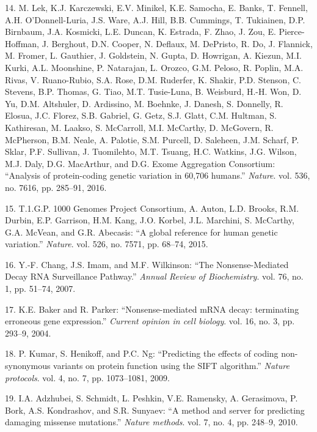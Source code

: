 \documentclass[12pt,twoside]{ugathesis}
\begin{document}
\hypertarget{ref-Lek2016}{}
14. M. Lek, K.J. Karczewski, E.V. Minikel, K.E. Samocha, E. Banks, T.
Fennell, A.H. O'Donnell-Luria, J.S. Ware, A.J. Hill, B.B. Cummings, T.
Tukiainen, D.P. Birnbaum, J.A. Kosmicki, L.E. Duncan, K. Estrada, F.
Zhao, J. Zou, E. Pierce-Hoffman, J. Berghout, D.N. Cooper, N. Deflaux,
M. DePristo, R. Do, J. Flannick, M. Fromer, L. Gauthier, J. Goldstein,
N. Gupta, D. Howrigan, A. Kiezun, M.I. Kurki, A.L. Moonshine, P.
Natarajan, L. Orozco, G.M. Peloso, R. Poplin, M.A. Rivas, V.
Ruano-Rubio, S.A. Rose, D.M. Ruderfer, K. Shakir, P.D. Stenson, C.
Stevens, B.P. Thomas, G. Tiao, M.T. Tusie-Luna, B. Weisburd, H.-H. Won,
D. Yu, D.M. Altshuler, D. Ardissino, M. Boehnke, J. Danesh, S. Donnelly,
R. Elosua, J.C. Florez, S.B. Gabriel, G. Getz, S.J. Glatt, C.M. Hultman,
S. Kathiresan, M. Laakso, S. McCarroll, M.I. McCarthy, D. McGovern, R.
McPherson, B.M. Neale, A. Palotie, S.M. Purcell, D. Saleheen, J.M.
Scharf, P. Sklar, P.F. Sullivan, J. Tuomilehto, M.T. Tsuang, H.C.
Watkins, J.G. Wilson, M.J. Daly, D.G. MacArthur, and D.G. Exome
Aggregation Consortium: ``Analysis of protein-coding genetic variation
in 60,706 humans.'' \emph{Nature}. vol. 536, no. 7616, pp. 285--91,
2016.

\hypertarget{ref-1000GenomesProjectConsortium2015}{}
15. T.1.G.P. 1000 Genomes Project Consortium, A. Auton, L.D. Brooks,
R.M. Durbin, E.P. Garrison, H.M. Kang, J.O. Korbel, J.L. Marchini, S.
McCarthy, G.A. McVean, and G.R. Abecasis: ``A global reference for human
genetic variation.'' \emph{Nature}. vol. 526, no. 7571, pp. 68--74,
2015.

\hypertarget{ref-Chang2007}{}
16. Y.-F. Chang, J.S. Imam, and M.F. Wilkinson: ``The Nonsense-Mediated
Decay RNA Surveillance Pathway.'' \emph{Annual Review of Biochemistry}.
vol. 76, no. 1, pp. 51--74, 2007.

\hypertarget{ref-Baker2004}{}
17. K.E. Baker and R. Parker: ``Nonsense-mediated mRNA decay:
terminating erroneous gene expression.'' \emph{Current opinion in cell
biology}. vol. 16, no. 3, pp. 293--9, 2004.

\hypertarget{ref-Kumar2009}{}
18. P. Kumar, S. Henikoff, and P.C. Ng: ``Predicting the effects of
coding non-synonymous variants on protein function using the SIFT
algorithm.'' \emph{Nature protocols}. vol. 4, no. 7, pp. 1073--1081,
2009.

\hypertarget{ref-Adzhubei2010}{}
19. I.A. Adzhubei, S. Schmidt, L. Peshkin, V.E. Ramensky, A. Gerasimova,
P. Bork, A.S. Kondrashov, and S.R. Sunyaev: ``A method and server for
predicting damaging missense mutations.'' \emph{Nature methods}. vol. 7,
no. 4, pp. 248--9, 2010.
\end{document}
